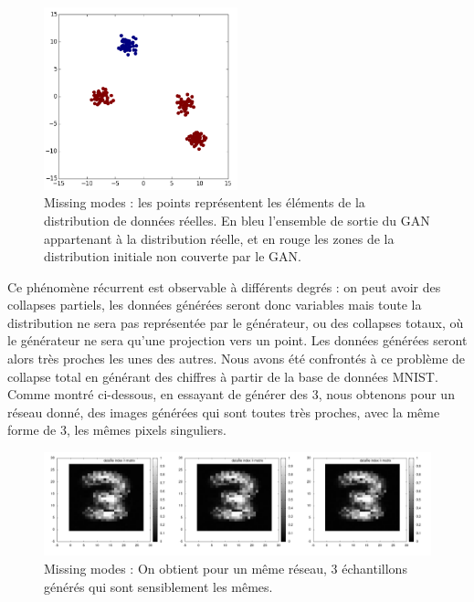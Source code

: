 \begin{figure}[h]
\begin{center}
\includegraphics[width=0.5\textwidth]{images/missing_modes.png}\caption{Missing modes : les points représentent les éléments de la distribution de données réelles. En bleu l'ensemble de sortie du GAN appartenant à la distribution réelle, et en rouge les zones de la distribution initiale non couverte par le GAN.}
\end{center}
\end{figure} 

Ce phénomène récurrent est observable à différents degrés : on peut avoir des collapses partiels, les données générées seront donc variables mais toute la distribution ne sera pas représentée par le générateur, ou des collapses totaux, où le générateur ne sera qu'une projection vers un point. Les données générées seront alors très proches les unes des autres.
Nous avons été confrontés à ce problème de collapse total en générant des chiffres à partir de la base de données MNIST. Comme montré ci-dessous, en essayant de générer des 3, nous obtenons pour un réseau donné, des images générées qui sont toutes très proches, avec la même forme de 3, les mêmes pixels singuliers.

\begin{figure}[h]
\begin{center}
\includegraphics[width=1\textwidth]{images/missing_modes_2.png}\caption{Missing modes : On obtient pour un même réseau, 3 échantillons générés qui sont sensiblement les mêmes.}
\end{center}
\end{figure}


